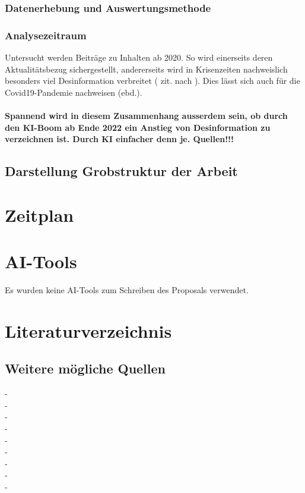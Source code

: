 \documentclass[12pt,a4paper]{article}        %
\begin{document}
\subsubsection{Datenerhebung und Auswertungsmethode}
\subsubsection{Analysezeitraum}
Untersucht werden Beiträge zu Inhalten ab 2020. So wird einerseits deren Aktualitätsbezug sichergestellt, andererseits wird in Krisenzeiten nachweislich besonders viel Desinformation verbreitet (\textcite{tandoc_defining_2018} zit. nach \textcite[2]{ceron_fake_2021}). Dies lässt sich auch für die Covid19-Pandemie nachweisen (ebd.).

\paragraph{\color{red}Spannend wird in diesem Zusammenhang ausserdem sein, ob durch den KI-Boom ab Ende 2022 ein Anstieg von Desinformation zu verzeichnen ist. Durch KI einfacher denn je. Quellen!!!}


\subsection{Darstellung Grobstruktur der Arbeit}

\section{Zeitplan}

\section{AI-Tools}
Es wurden keine AI-Tools zum Schreiben des Proposals verwendet.

\pagebreak
\section{Literaturverzeichnis}
\printbibliography
\subsection{Weitere mögliche Quellen}

- \cite{antos_web_2019} \\
- \cite{brill_death_2024} \\
- \cite{fernandes_post-factual_2022} \\
- \cite{latzer_vertrauen_2023} \\
- \cite{reuter_fake_2019} \\
- \cite{wahl_fake_2021} \\
- \cite{dander_fake_2020} \\
- \cite{waller_jamesfocus_2019} \\
- \cite{zoglauer_konstruierte_2021} \\
\end{document}
